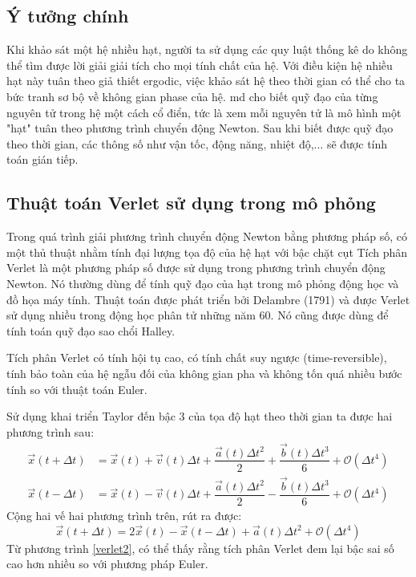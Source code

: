 \documentclass[12pt,a4paper,reqno, oneside]{book}
\begin{document}
	\subsection{Ý tưởng chính}
	\hspace{18pt}
	Khi khảo sát một hệ nhiều hạt, người ta sử dụng các quy luật thống kê do không thể tìm được lời giải giải tích cho mọi tính chất của hệ. Với điều kiện hệ nhiều hạt này tuân theo giả thiết ergodic, việc khảo sát hệ theo thời gian có thể cho ta bức tranh sơ bộ về không gian phase của hệ.
	\Gls{md} cho biết quỹ đạo của từng nguyên tử trong hệ một cách cổ điển, tức là xem mỗi nguyên tử là mô hình một "hạt" tuân theo phương trình chuyển động Newton. Sau khi biết được quỹ đạo theo thời gian, các thông số như vận tốc, động năng, nhiệt độ,... sẽ được tính toán gián tiếp.
	\subsection{Thuật toán Verlet sử dụng trong mô phỏng}
	\hspace{18pt}
		Trong quá trình giải phương trình chuyển động Newton bằng phương pháp số, có một thủ thuật nhằm tính đại lượng tọa độ của hệ hạt với bậc chặt cụt
		Tích phân Verlet\cite{Verlet1967} là một phương pháp số được sử dụng trong phương trình chuyển động Newton. Nó thường dùng để tính quỹ đạo của hạt trong mô phỏng động học và đồ họa máy tính. Thuật toán được phát triển bởi Delambre (1791) và được Verlet sử dụng nhiều trong động học phân tử những năm 60. Nó cũng được dùng để tính toán quỹ đạo sao chổi Halley.
			
		Tích phân Verlet có tính hội tụ cao, có tính chất suy ngược (time-reversible), tính bảo toàn của hệ ngẫu đối của không gian pha và không tốn quá nhiều bước tính so với thuật toán Euler.
			
		Sử dụng khai triển Taylor đến bậc 3 của tọa độ hạt theo thời gian ta được hai phương trình sau:
		\begin{align}
		\vec{x}\left(t+\Delta t\right) &=\vec{x}\left(t\right)+\vec{v}\left(t\right)\Delta t + \dfrac{\vec{a}\left(t\right)\Delta t^{2}}{2} + \dfrac{\vec{b}\left(t\right)\Delta t^{3}}{6} + \mathcal{O}\left(\Delta t^{4}\right)\\
		\vec{x}\left(t-\Delta t\right) &=\vec{x}\left(t\right)-\vec{v}\left(t\right)\Delta t + \dfrac{\vec{a}\left(t\right)\Delta t^{2}}{2} - \dfrac{\vec{b}\left(t\right)\Delta t^{3}}{6} + \mathcal{O}\left(\Delta t^{4}\right)
		\label{verlet1}
		\end{align}
		Cộng hai vế hai phương trình trên, rút ra được:
		\begin{equation}
		\vec{x}\left(t+\Delta t\right)=2\vec{x}\left(t\right)-\vec{x}\left(t-\Delta t\right)+\vec{a}\left(t\right)\Delta t^{2}+\mathcal{O}\left(\Delta t^{4}\right)
		\label{verlet2}
		\end{equation}
		Từ phương trình \eqref{verlet2}, có thể thấy rằng tích phân Verlet đem lại bậc sai số cao hơn nhiều so với phương pháp Euler.
\end{document}
